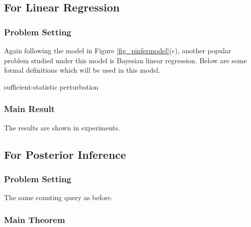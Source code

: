 \documentclass{article}
\begin{document}
\subsection{For Linear Regression
\texorpdfstring{\cite{bernstein2019differentially}}{}}
%

\subsubsection{Problem Setting}
%
Again following the model in Figure \ref{fig_pinfermodel}(c), another popular problem studied under this model is Bayesian linear regression. 
%
Below are some formal definitions which will be used in this model.

%
\begin{definition}
\end{definition}

\begin{definition}
 sufficient-statistic perturbation
\end{definition}

\begin{definition}
\end{definition}

\begin{definition}
\end{definition}
%
%
\subsubsection{Main Result}
%
The results are shown in experiments.

\subsection{For Posterior Inference
\texorpdfstring{\cite{Zhang2017privbayes}}{}}
%

\subsubsection{Problem Setting}
%
The same counting query as before.
\begin{definition}
\end{definition}

\begin{definition}
\end{definition}
\subsubsection{Main Theorem}
\begin{thm}
\end{thm}
%
%
\end{document}
